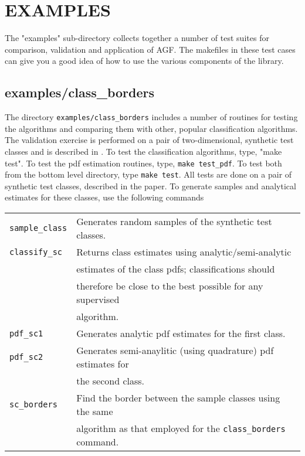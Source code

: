 \documentclass[12pt]{article}
\begin{document}
\section{EXAMPLES}

  The "examples" sub-directory collects together a number of test suites for comparison, validation and application of AGF.  The makefiles in these test cases can give you a good idea of how to use the various components of the library.

\subsection{examples/class\_borders}

The directory \verb"examples/class_borders" includes a number of routines for testing the algorithms and comparing them with other, popular classification algorithms.  The validation exercise is performed on a pair of two-dimensional, synthetic test classes and is described in \citet{Mills2011}.  To test the classification algorithms, type, "make test".  To test the pdf estimation routines, type, \verb"make test_pdf".  To test both from the bottom level directory, type \verb"make test".  All tests are done on a pair of synthetic test classes, described in the paper.  To generate samples and analytical estimates for these classes, use the following commands

\begin{tabular}{ll}
\verb/sample_class/ & Generates random samples of the synthetic test classes.\\
\verb/classify_sc/ & Returns class estimates using analytic/semi-analytic \\
		   & estimates of the class pdfs; classifications should \\
		     & therefore be close to the best possible for any supervised \\
       & algorithm.\\
\verb/pdf_sc1/ & Generates analytic pdf estimates for the first class.\\
\verb/pdf_sc2/ & Generates semi-anaylitic (using quadrature) pdf estimates for \\
	       & the second class.\\
\verb/sc_borders/ & Find the border between the sample classes using the same \\
		  & algorithm as that employed for the \verb"class_borders" command.
\end{tabular}
\end{document}
